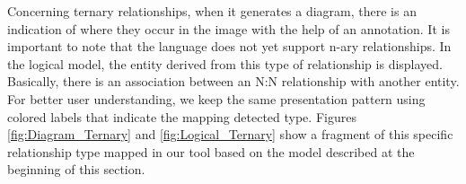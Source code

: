 Concerning ternary relationships, when it generates a diagram, there is an indication of where they occur in the image with the help of an annotation.
It is important to note that the language does not yet support n-ary relationships.
In the logical model, the entity derived from this type of relationship is displayed.
Basically, there is an association between an N:N relationship with another entity.
For better user understanding, we keep the same presentation pattern using colored labels that indicate the mapping detected type.
Figures \ref{fig:Diagram_Ternary} and \ref{fig:Logical_Ternary} show a fragment of this specific relationship type mapped in our tool based on the model described at the beginning of this section.

